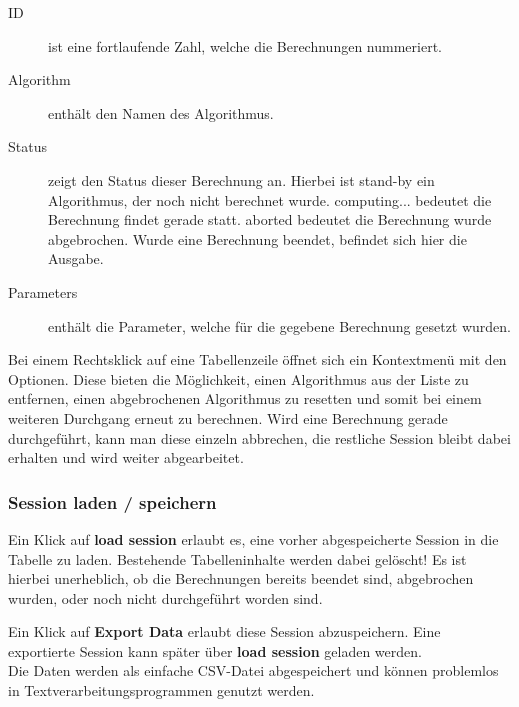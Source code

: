 \documentclass[
  a4paper,               %
  twoside,               %
  DIV=12,                %
  BCOR=8mm,              %
  headinclude=true,      %
  footinclude=false,     %
  numbers=noenddot,      %
  headheight=40pt,       %
  11pt]{scrartcl}        %
\begin{document}
\begin{description}
\item[ID] ist eine fortlaufende Zahl, welche die Berechnungen nummeriert. \\

\item[Algorithm] enthält den Namen des Algorithmus.

\item[Status] zeigt den Status dieser Berechnung an. Hierbei ist \glqq stand-by \grqq ein Algorithmus, der noch nicht berechnet wurde. \glqq computing... \grqq bedeutet die Berechnung findet gerade statt. \glqq aborted \grqq bedeutet die Berechnung wurde abgebrochen. Wurde eine Berechnung beendet, befindet sich hier die Ausgabe.

\item[Parameters] enthält die Parameter, welche für die gegebene Berechnung gesetzt wurden.
\end{description}

Bei einem Rechtsklick auf eine Tabellenzeile öffnet sich ein Kontextmenü mit den Optionen. Diese bieten die Möglichkeit, einen Algorithmus aus der Liste zu entfernen, einen abgebrochenen Algorithmus zu resetten und somit bei einem weiteren Durchgang erneut zu berechnen. Wird eine Berechnung gerade durchgeführt, kann man diese einzeln abbrechen, die restliche Session bleibt dabei erhalten und wird weiter abgearbeitet.

\subsubsection{Session laden / speichern}
Ein Klick auf \textbf{load session} erlaubt es, eine vorher abgespeicherte Session in die Tabelle zu laden. Bestehende Tabelleninhalte werden dabei gelöscht!
Es ist hierbei unerheblich, ob die Berechnungen bereits beendet sind, abgebrochen wurden, oder noch nicht durchgeführt worden sind.
\vspace{\baselineskip}

Ein Klick auf \textbf{Export Data} erlaubt diese Session abzuspeichern.
Eine exportierte Session kann später über \textbf{load session} geladen werden. \\
Die Daten werden als einfache CSV-Datei abgespeichert und können problemlos in Textverarbeitungsprogrammen genutzt werden.
\end{document}
